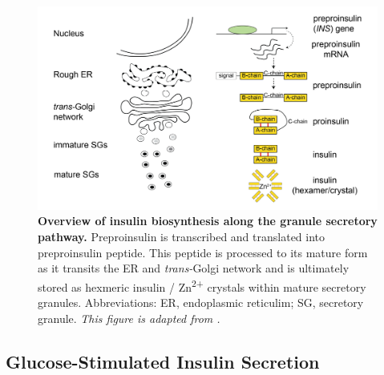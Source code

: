 \begin{figure}[t]
    \centering
    \includegraphics[width=\linewidth]{Chapter1/Fig/F1-9-01.png}
    \caption[Insulin biosynthesis in $\beta$-cells]{\textbf{Overview of insulin biosynthesis along the granule secretory pathway.} Preproinsulin  is transcribed and translated into preproinsulin peptide. This peptide is processed to its mature form as it transits the ER and \textit{trans-}Golgi network and is ultimately stored as hexmeric insulin / Zn\textsuperscript{2+} crystals within mature secretory granules. Abbreviations: ER, endoplasmic reticulim; SG, secretory granule. \textit{This figure is adapted from \textbf{\cite{tokarz_cell_2018}}.}}
    \label{fig:chp1_ins_bio}
\end{figure}

\subsection{Glucose-Stimulated Insulin Secretion} %
\label{sec:gsis}

